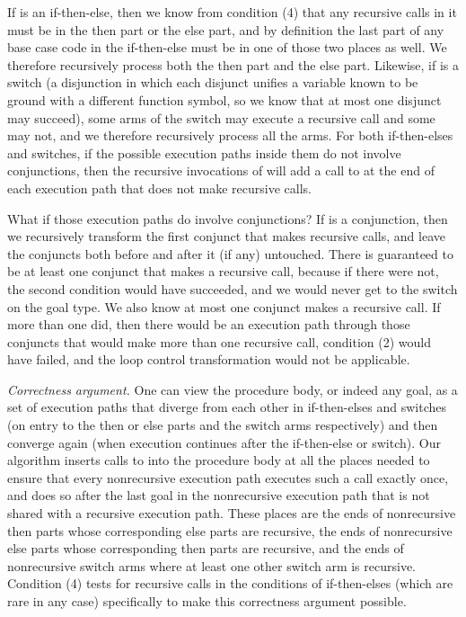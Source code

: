 If  is an if-then-else,
then we know from condition (4)
that any recursive calls in it
must be in the then part or the else part,
and by definition the last part of any base case code
in the if-then-else must be in one of those two places as well.
We therefore recursively process both the then part and the else part.
Likewise, if  is a switch
(a disjunction in which each disjunct unifies a variable known to be ground
with a different function symbol,
so we know that at most one disjunct may succeed),
some arms of the switch may execute a recursive call and some may not,
and we therefore recursively process all the arms.
For both if-then-elses and switches,
if the possible execution paths inside them do not involve conjunctions,
then the recursive invocations of \putbarriers
will add a call to  at
the end of each execution path that does not make recursive calls.

What if those execution paths do involve conjunctions?
If  is a conjunction,
then we recursively transform the first conjunct that makes recursive calls,
and leave the conjuncts both before and after it (if any) untouched.
There is guaranteed to be at least one conjunct that makes a recursive call,
because if there were not, the second condition would have succeeded,
and we would never get to the switch on the goal type.
We also know at most one conjunct makes a recursive call.
If more than one did, then
there would be an execution path through those conjuncts
that would make more than one recursive call,
condition (2) would have failed,
and the loop control transformation would not be applicable.

\emph{Correctness argument.}
One can view the procedure body, or indeed any goal,
as a set of execution paths that
diverge from each other
in if-then-elses and switches
(on entry to the then or else parts and the switch arms respectively)
and then converge again
(when execution continues after the if-then-else or switch).
Our algorithm inserts calls to  into the procedure body
at all the places needed to ensure
that every nonrecursive execution path executes such a call exactly once,
and does so after the last goal in the nonrecursive execution path
that is not shared with a recursive execution path.
These places are
the ends of nonrecursive then parts
whose corresponding else parts are recursive,
the ends of nonrecursive else parts
whose corresponding then parts are recursive,
and the ends of nonrecursive switch arms
where at least one other switch arm is recursive.
Condition (4) tests for recursive calls in the conditions of if-then-elses
(which are rare in any case)
specifically to make this correctness argument possible.

